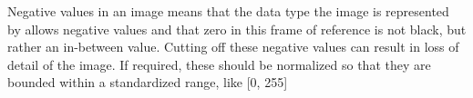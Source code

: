 Negative values in an image means that the data type the image is represented by allows negative values and that zero in this frame of reference is not black, but rather an in-between value. Cutting off these negative values can result in loss of detail of the image. If required, these should be normalized so that they are bounded within a standardized range, like [0, 255]